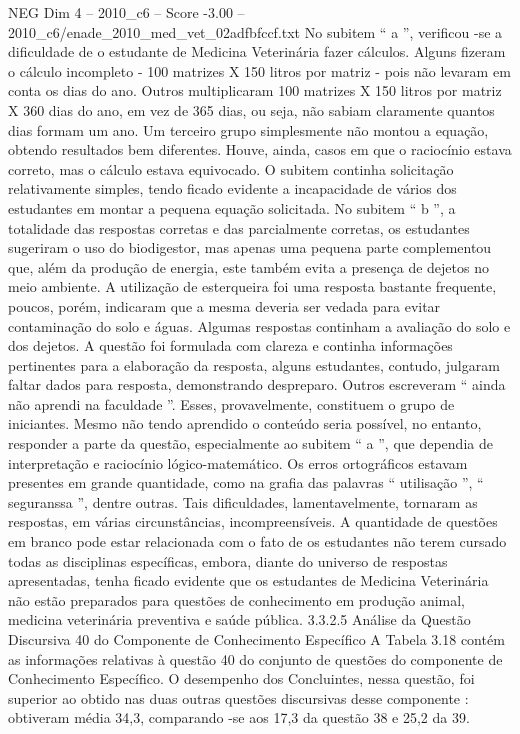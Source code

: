 \begin{textsample}{NEG Dim 4 – 2010\_c6 – Score -3.00 – 2010\_c6/enade\_2010\_med\_vet\_02adfbfccf.txt}
No subitem “ a ”, verificou -se a dificuldade de o estudante de Medicina Veterinária fazer cálculos.
Alguns fizeram o cálculo incompleto - 100 matrizes X 150 litros por matriz - pois não levaram em conta os dias do ano.
Outros multiplicaram 100 matrizes X 150 litros por matriz X 360 dias do ano, em vez de 365 dias, ou seja, não sabiam claramente quantos dias formam um ano.
Um terceiro grupo simplesmente não montou a equação, obtendo resultados bem diferentes.
Houve, ainda, casos em que o raciocínio estava correto, mas o cálculo estava equivocado.
O subitem continha solicitação relativamente simples, tendo ficado evidente a incapacidade de vários dos estudantes em montar a pequena equação solicitada.
No subitem “ b ”, a totalidade das respostas corretas e das parcialmente corretas, os estudantes sugeriram o uso do biodigestor, mas apenas uma pequena parte complementou que, além da produção de energia, este também evita a presença de dejetos no meio ambiente.
A utilização de esterqueira foi uma resposta bastante frequente, poucos, porém, indicaram que a mesma deveria ser vedada para evitar contaminação do solo e águas.
Algumas respostas continham a avaliação do solo e dos dejetos.
A questão foi formulada com clareza e continha informações pertinentes para a elaboração da resposta, alguns estudantes, contudo, julgaram faltar dados para resposta, demonstrando despreparo.
Outros escreveram “ ainda não aprendi na faculdade ”.
Esses, provavelmente, constituem o grupo de iniciantes.
Mesmo não tendo aprendido o conteúdo seria possível, no entanto, responder a parte da questão, especialmente ao subitem “ a ”, que dependia de interpretação e raciocínio lógico-matemático.
Os erros ortográficos estavam presentes em grande quantidade, como na grafia das palavras “ utilisação ”, “ seguranssa ”, dentre outras.
Tais dificuldades, lamentavelmente, tornaram as respostas, em várias circunstâncias, incompreensíveis.
A quantidade de questões em branco pode estar relacionada com o fato de os estudantes não terem cursado todas as disciplinas específicas, embora, diante do universo de respostas apresentadas, tenha ficado evidente que os estudantes de Medicina Veterinária não estão preparados para questões de conhecimento em produção animal, medicina veterinária preventiva e saúde pública. 3.3.2.5 Análise da Questão Discursiva 40 do Componente de Conhecimento Específico A Tabela 3.18 contém as informações relativas à questão 40 do conjunto de questões do componente de Conhecimento Específico.
O desempenho dos Concluintes, nessa questão, foi superior ao obtido nas duas outras questões discursivas desse componente : obtiveram média 34,3, comparando -se aos 17,3 da questão 38 e 25,2 da 39.

\end{textsample}

